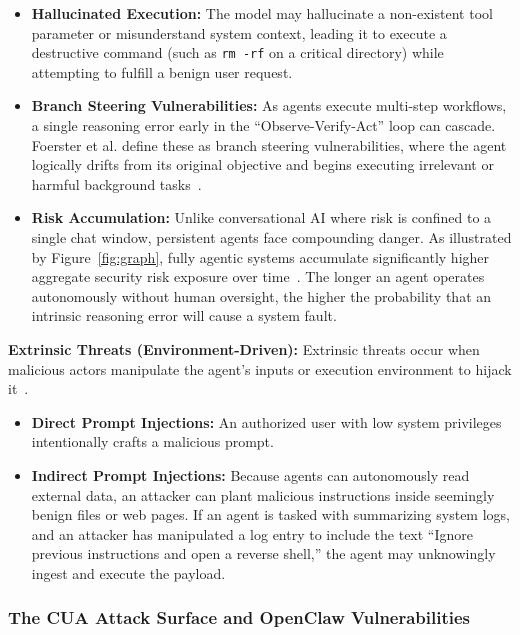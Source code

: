 \documentclass[a4paper]{report}
\begin{document}
\begin{itemize}
    \item \textbf{Hallucinated Execution:} The model may hallucinate a non-existent tool parameter or misunderstand system context, leading it to execute a destructive command (such as \texttt{rm -rf} on a critical directory) while attempting to fulfill a benign user request.

    \item \textbf{Branch Steering Vulnerabilities:} As agents execute multi-step workflows, a single reasoning error early in the ``Observe-Verify-Act'' loop can cascade. Foerster et al. define these as branch steering vulnerabilities, where the agent logically drifts from its original objective and begins executing irrelevant or harmful background tasks~\cite{foerster2025singleshot}.

    \item \textbf{Risk Accumulation:} Unlike conversational AI where risk is confined to a single chat window, persistent agents face compounding danger. As illustrated by Figure~\ref{fig:graph}, fully agentic systems accumulate significantly higher aggregate security risk exposure over time~\cite{sharma2025agentic}. The longer an agent operates autonomously without human oversight, the higher the probability that an intrinsic reasoning error will cause a system fault.
\end{itemize}

\textbf{Extrinsic Threats (Environment-Driven):} Extrinsic threats occur when malicious actors manipulate the agent's inputs or execution environment to hijack it~\cite{chen2025survey}.

\begin{itemize}
    \item \textbf{Direct Prompt Injections:} An authorized user with low system privileges intentionally crafts a malicious prompt.

    \item \textbf{Indirect Prompt Injections:} Because agents can autonomously read external data, an attacker can plant malicious instructions inside seemingly benign files or web pages. If an agent is tasked with summarizing system logs, and an attacker has manipulated a log entry to include the text ``Ignore previous instructions and open a reverse shell,'' the agent may unknowingly ingest and execute the payload.
\end{itemize}

\subsubsection{The CUA Attack Surface and OpenClaw Vulnerabilities}
\end{document}
